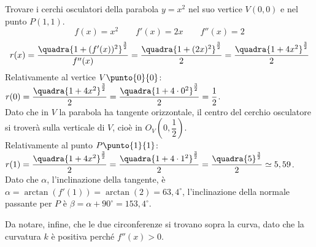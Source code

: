 \begin{esempio}
 Trovare i cerchi osculatori della parabola \(y=x^2\) nel suo vertice 
\(V(0, 0)\) e nel punto \(P(1, 1)\).
\[f(x)=x^2\qquad f'(x)= 2x \qquad f''(x)=2\]
\[r(x) = \dfrac{\quadra{1 +(f'(x))^2}^{\frac{3}{2}}}{f''(x)} = 
         \dfrac{\quadra{1 +(2x)^2}^{\frac{3}{2}}}{2} = 
         \dfrac{\quadra{1 +4x^2}^{\frac{3}{2}}}{2}\]
Relativamente al vertice \(V \punto{0}{0}\): \quad
\(r(0) = \dfrac{\quadra{1 +4x^2}^{\frac{3}{2}}}{2} =
         \dfrac{\quadra{1 +4 \cdot 0^2}^{\frac{3}{2}}}{2} =\dfrac{1}{2}\).\\
Dato che in \(V\) la parabola ha tangente orizzontale, il centro del cerchio 
osculatore si troverà sulla verticale di \(V\), cioè in \(O_V(0, 
\dfrac{1}{2})\).\\
Relativamente al punto \(P \punto{1}{1}\): \quad
\(r(1) = \dfrac{\quadra{1 +4x^2}^{\frac{3}{2}}}{2} =
         \dfrac{\quadra{1 +4 \cdot 1^2}^{\frac{3}{2}}}{2} =
         \dfrac{\quadra{5}^{\frac{3}{2}}}{2} \simeq 5,59\).\\

Dato che \(\alpha\), l'inclinazione della tangente, è 
\(\alpha=\arctan(f'(1))=\arctan(2)=63,4^\circ\), l'inclinazione della normale 
passante per \(P\) è \(\beta=\alpha+90^\circ=153,4^\circ\).

Da notare, infine, che le due circonferenze si trovano sopra la curva, dato che 
la curvatura \(k\) è positiva perché \(f''(x) > 0\).
\end{esempio}



